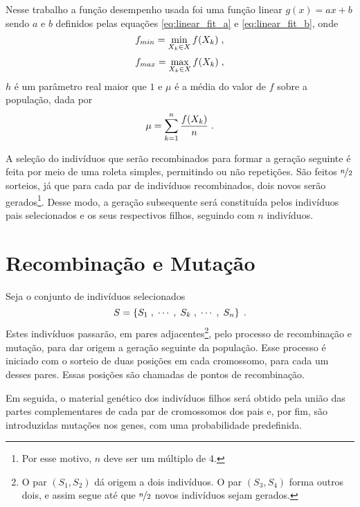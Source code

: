 Nesse trabalho a função desempenho usada foi uma função linear $ g(x) = ax + b $
sendo $a$ e $b$ definidos pelas equações \ref{eq:linear_fit_a} e \ref{eq:linear_fit_b},
onde
\begin{equation}
  f_{min} = \min_{X_k \in X} f(X_k) \;\mathrm{,}
\end{equation}
\begin{equation}
  f_{max} = \max_{X_k \in X} f(X_k) \;\mathrm{,}
\end{equation}
$h$ é um parâmetro real maior que $1$ e $\mu$ é a média do valor de $f$ sobre a população, dada por
\begin{equation}
  \mu = \sum_{k = 1}^n \frac{f(X_k)}{n} \;\mathrm{.}
\end{equation}

A seleção do indivíduos que serão recombinados para formar a geração seguinte é feita por meio
de uma roleta simples, permitindo ou não repetições. São feitos $ \nicefrac{n}{2} $ sorteios,
já que para cada par de indivíduos recombinados, dois novos serão gerados\footnote{
  Por esse motivo, $n$ deve ser um múltiplo de 4.
}.
Desse modo, a geração subsequente será constituída pelos indivíduos pais selecionados e os seus
respectivos filhos, seguindo com $n$ indivíduos.

\section{Recombinação e Mutação}

Seja o conjunto de indivíduos selecionados
\begin{equation}
  S = \left\{ S_1\;, \;\cdots\;,  \;S_k\;, \;\cdots\;, \;S_n \right\} \;\mathrm{.}
  \label{eq:selection}
\end{equation}
Estes indivíduos passarão, em pares adjacentes\footnote{
  O par $ (S_1, S_2) $ dá origem a dois indivíduos. O par $ (S_3, S_4) $ forma outros dois, e assim segue
  até que $ \nicefrac{n}{2} $ novos indivíduos sejam gerados.
}, pelo processo de recombinação e mutação, para dar origem a
geração seguinte da população. Esse processo é iniciado com o sorteio de duas posições em cada cromossomo,
para cada um desses pares. Essas posições são chamadas de pontos de recombinação.

Em seguida, o material genético dos indivíduos filhos será obtido pela união das partes complementares
de cada par de cromossomos dos pais e, por fim, são introduzidas mutações nos genes, com uma probabilidade predefinida.



